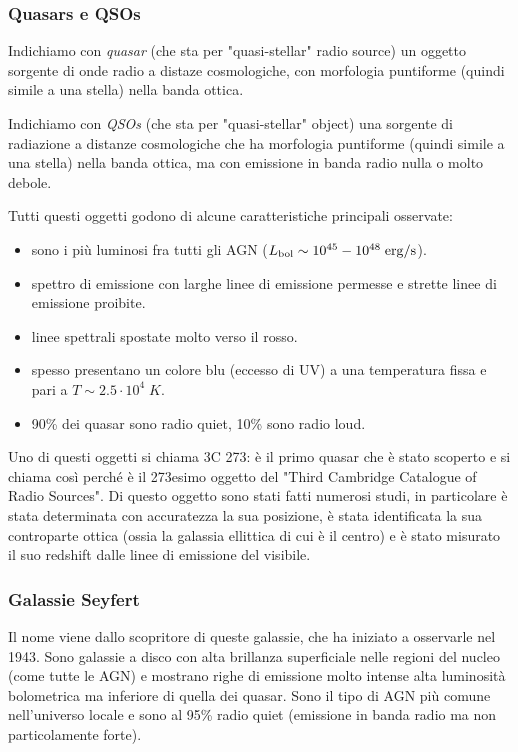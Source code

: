 \subsubsection{Quasars e QSOs}
Indichiamo con \emph{quasar} (che sta per "quasi-stellar" radio source) un oggetto sorgente di onde radio a distaze cosmologiche, con morfologia puntiforme (quindi simile a una stella) nella banda ottica. 

Indichiamo con \emph{QSOs} (che sta per "quasi-stellar" object) una sorgente di radiazione a distanze cosmologiche che ha morfologia puntiforme (quindi simile a una stella) nella banda ottica, ma con emissione in banda radio nulla o molto debole.

Tutti questi oggetti godono di alcune caratteristiche principali osservate:
\begin{itemize}
    \item sono i più luminosi fra tutti gli AGN ($L_\textup{bol} \sim 10^{45}-10^{48} \;\si{erg}/\si{s}$).
    \item spettro di emissione con larghe linee di emissione permesse e strette linee di emissione proibite.
    \item linee spettrali spostate molto verso il rosso.
    \item spesso presentano un colore blu (eccesso di UV) a una temperatura fissa e pari a $T\sim 2.5\cdot 10^4 \;\si{K}$.
    \item 90\% dei quasar sono radio quiet, 10\% sono radio loud.
\end{itemize}

Uno di questi oggetti si chiama 3C 273: è il primo quasar che è stato scoperto e si chiama così perché è il 273esimo oggetto del "Third Cambridge Catalogue of Radio Sources". Di questo oggetto sono stati fatti numerosi studi, in particolare è stata determinata con accuratezza la sua posizione, è stata identificata la sua controparte ottica (ossia la galassia ellittica di cui è il centro) e è stato misurato il suo redshift dalle linee di emissione del visibile. 

\subsubsection{Galassie Seyfert}
Il nome viene dallo scopritore di queste galassie, che ha iniziato a osservarle nel 1943. Sono galassie a disco con alta brillanza superficiale nelle regioni del nucleo (come tutte le AGN) e mostrano righe di emissione molto intense alta luminosità bolometrica ma inferiore di quella dei quasar.
Sono il tipo di AGN più comune nell’universo locale e sono al 95\% radio quiet (emissione in banda radio ma non particolamente forte).

